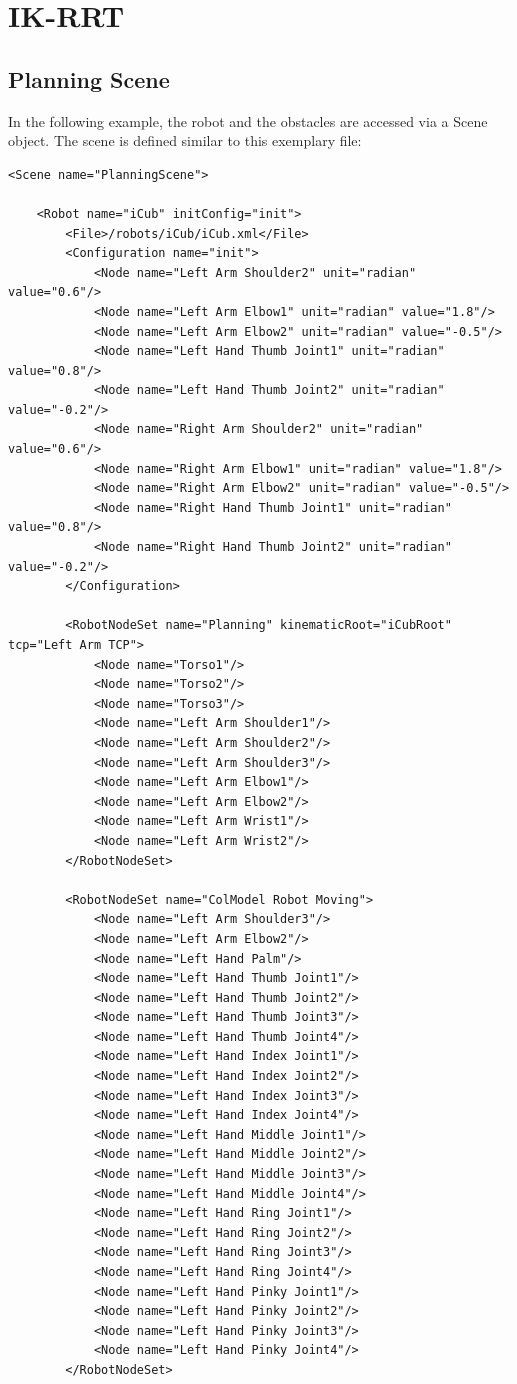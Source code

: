 \documentclass{book}
\begin{document}
\section{IK-RRT}
\subsection{Planning Scene}
In the following example, the robot and the obstacles are accessed via a Scene object. The scene is defined similar to this exemplary file: 
\begin{lstlisting}
<Scene name="PlanningScene">

    <Robot name="iCub" initConfig="init">
        <File>/robots/iCub/iCub.xml</File>
        <Configuration name="init">
            <Node name="Left Arm Shoulder2" unit="radian" value="0.6"/>
            <Node name="Left Arm Elbow1" unit="radian" value="1.8"/>
            <Node name="Left Arm Elbow2" unit="radian" value="-0.5"/>
            <Node name="Left Hand Thumb Joint1" unit="radian" value="0.8"/>
            <Node name="Left Hand Thumb Joint2" unit="radian" value="-0.2"/>
            <Node name="Right Arm Shoulder2" unit="radian" value="0.6"/>
            <Node name="Right Arm Elbow1" unit="radian" value="1.8"/>
            <Node name="Right Arm Elbow2" unit="radian" value="-0.5"/>
            <Node name="Right Hand Thumb Joint1" unit="radian" value="0.8"/>
            <Node name="Right Hand Thumb Joint2" unit="radian" value="-0.2"/>
        </Configuration>

        <RobotNodeSet name="Planning" kinematicRoot="iCubRoot" tcp="Left Arm TCP">
            <Node name="Torso1"/>
            <Node name="Torso2"/>
            <Node name="Torso3"/>
            <Node name="Left Arm Shoulder1"/>
            <Node name="Left Arm Shoulder2"/>
            <Node name="Left Arm Shoulder3"/>
            <Node name="Left Arm Elbow1"/>
            <Node name="Left Arm Elbow2"/>
            <Node name="Left Arm Wrist1"/>
            <Node name="Left Arm Wrist2"/>
        </RobotNodeSet>

        <RobotNodeSet name="ColModel Robot Moving">
            <Node name="Left Arm Shoulder3"/>
            <Node name="Left Arm Elbow2"/>
            <Node name="Left Hand Palm"/>
            <Node name="Left Hand Thumb Joint1"/>
            <Node name="Left Hand Thumb Joint2"/>
            <Node name="Left Hand Thumb Joint3"/>
            <Node name="Left Hand Thumb Joint4"/>
            <Node name="Left Hand Index Joint1"/>
            <Node name="Left Hand Index Joint2"/>
            <Node name="Left Hand Index Joint3"/>
            <Node name="Left Hand Index Joint4"/>
            <Node name="Left Hand Middle Joint1"/>
            <Node name="Left Hand Middle Joint2"/>
            <Node name="Left Hand Middle Joint3"/>
            <Node name="Left Hand Middle Joint4"/>
            <Node name="Left Hand Ring Joint1"/>
            <Node name="Left Hand Ring Joint2"/>
            <Node name="Left Hand Ring Joint3"/>
            <Node name="Left Hand Ring Joint4"/>
            <Node name="Left Hand Pinky Joint1"/>
            <Node name="Left Hand Pinky Joint2"/>
            <Node name="Left Hand Pinky Joint3"/>
            <Node name="Left Hand Pinky Joint4"/>
        </RobotNodeSet>


\end{lstlisting}
\end{document}
